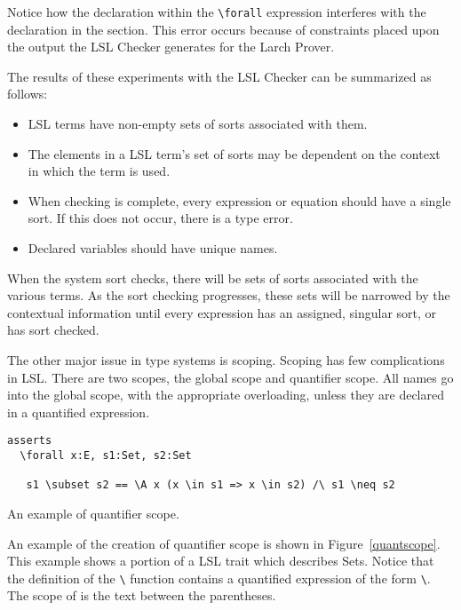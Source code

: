 \noindent Notice how the  declaration within the
\verb+\+\texttt{forall} expression interferes with the 
declaration in the  section. This error occurs
because of constraints placed upon the output the LSL Checker
generates for the Larch Prover. 


The results of these experiments with the LSL Checker can be
summarized as follows:

\begin{itemize}
\item LSL terms have non-empty sets of sorts associated with them. 
\item The elements in a LSL term's set of sorts may be dependent on
the context in which the term is used.
\item When checking is complete, every expression or equation
should have a single sort. If this does not occur, there is a type error.\item Declared variables should have unique names.
\end{itemize}

\noindent When the system sort checks, there will be sets of sorts
associated with the various terms. As the sort checking progresses,
these sets will be narrowed by the contextual information until every
expression has an assigned, singular sort, or has sort checked.

The other major issue in type systems is scoping. Scoping has few
complications in LSL. There are two scopes, the global scope and
quantifier scope. All names go into the global scope, with the
appropriate overloading, unless they are declared in a quantified
expression. 


\begin{BFIGURE}
\begin{verbatim}
asserts
  \forall x:E, s1:Set, s2:Set

   s1 \subset s2 == \A x (x \in s1 => x \in s2) /\ s1 \neq s2

\end{verbatim}
\caption{An example of quantifier scope.}
\label{quantscope}
\end{BFIGURE}

An example of the creation of quantifier scope is shown in
Figure~\ref{quantscope}. This example shows a portion of a LSL trait
which describes Sets. Notice that the definition of the
\verb+\+ function contains a quantified
expression of the form \verb+\+. The scope
of  is the text between the parentheses. 


